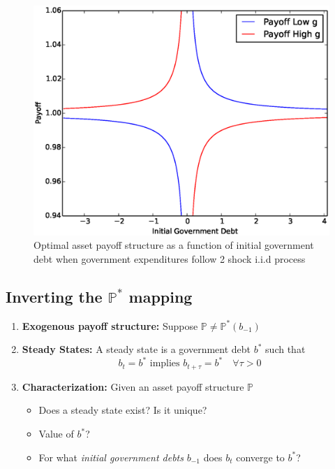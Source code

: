 \documentclass[12pt]{article}
\begin{document}
\begin{figure}
		\begin{center}
		\includegraphics[scale=.4]{Images/p_graph.eps}
		\caption{Optimal asset payoff structure as a function of initial government debt when government expenditures follow 2 shock i.i.d process}
	\end{center}	
	\end{figure}


\subsection{Inverting the $\mathbb{P}^*$ mapping}
	\begin{enumerate}
		\item  \textbf{Exogenous payoff structure:} Suppose $\mathbb{P}\neq \mathbb{P}^*(b_{-1})$
		
		\item \textbf{Steady States: } A steady state is a government debt   $b^*$ such that
		\[b_{t}=b^* \text{ implies } b_{t+\tau}=b^*\quad \forall \tau >0\]
	
			
		\item \textbf{Characterization: } Given an asset payoff structure $\mathbb{P}$
		\begin{itemize}
			\item Does a steady state exist? Is it unique?
			\item Value of $b^*$?
			\item For what   \emph{initial government debts} $b_{-1}$ does  $b_t$ converge to $b^*$?
 			\end{itemize}
	\end{enumerate}
\end{document}
